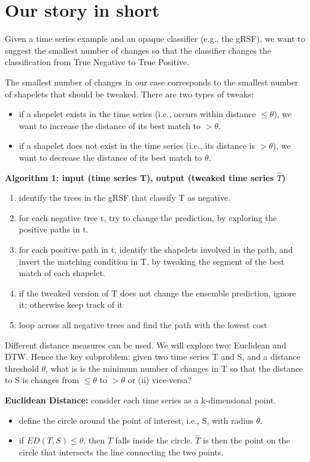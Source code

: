 \documentclass[smallextended,natbib]{svjour3}
\begin{document}
\section{Our story in short}
Given a time series example and an opaque classifier (e.g., the gRSF), we want to suggest the smallest number of changes so that the classifier changes the classification from True Negative to True Positive. 

The smallest number of changes in our case corresponds to the smallest number of shapelets that should be tweaked.  There are two types of tweaks:
\begin{itemize}
\item if a shepelet exists in the time series (i.e., occurs within distance $\leq \theta$), we want to increase the distance of its best match to $> \theta$.
\item if a shapelet does not exist in the time series (i.e., its distance is $> \theta$), we want to decrease the distance of its best match to $\theta$.
\end{itemize}

\smallskip
\noindent
\textbf{Algorithm 1: input (time series T), output (tweaked time series $\hat{T}$)}
\begin{enumerate}
    \item identify the trees in the gRSF that classify T as negative.
    \item for each negative tree t, try to change the prediction, by exploring the positive paths in t.
    \item for each positive path in t, identify the shapelets involved in the path, and invert the matching condition in T, by tweaking the segment of the best match of each shapelet.
    \item if the tweaked version of T does not change the ensemble prediction, ignore it; otherwise keep track of it
    \item loop across all negative trees and find the path with the lowest cost
\end{enumerate}

Different distance measures can be used. We will explore two: Euclidean and DTW. Hence the key subproblem: given two time series T and S, and a distance threshold $\theta$, what is is the minimum number of changes in T so that the distance to S is changes from $\leq \theta$ to $> \theta$ or (ii) vice-versa?

\smallskip
\noindent
\textbf{Euclidean Distance:} consider each time series as a k-dimensional point.
\begin{itemize}
    \item define the circle around the point of interest, i.e., S, with radius $\theta$.
    \item if $ED(T,S) \leq \theta$, then $T$ falls inside the circle. $\hat{T}$ is then the point on the circle that intersects the line connecting the two points.
\end{itemize}
\end{document}
